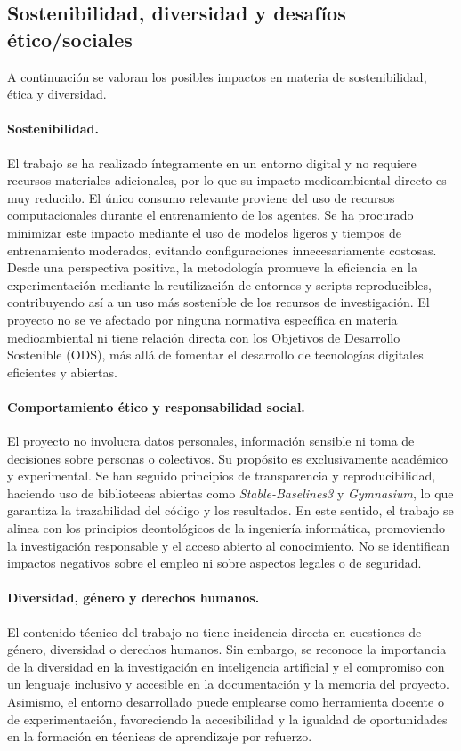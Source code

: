 \documentclass[12pt,a4paper,twoside,openany]{book}
\begin{document}
\subsection{Sostenibilidad, diversidad y desafíos ético/sociales}

A continuación se valoran los posibles impactos en materia de sostenibilidad, ética y diversidad.

\paragraph{Sostenibilidad.}
El trabajo se ha realizado íntegramente en un entorno digital y no requiere recursos materiales adicionales, por lo que su impacto medioambiental directo es muy reducido. El único consumo relevante proviene del uso de recursos computacionales durante el entrenamiento de los agentes. Se ha procurado minimizar este impacto mediante el uso de modelos ligeros y tiempos de entrenamiento moderados, evitando configuraciones innecesariamente costosas. Desde una perspectiva positiva, la metodología promueve la eficiencia en la experimentación mediante la reutilización de entornos y scripts reproducibles, contribuyendo así a un uso más sostenible de los recursos de investigación. El proyecto no se ve afectado por ninguna normativa específica en materia medioambiental ni tiene relación directa con los Objetivos de Desarrollo Sostenible (ODS), más allá de fomentar el desarrollo de tecnologías digitales eficientes y abiertas.

\paragraph{Comportamiento ético y responsabilidad social.}
El proyecto no involucra datos personales, información sensible ni toma de decisiones sobre personas o colectivos. Su propósito es exclusivamente académico y experimental. Se han seguido principios de transparencia y reproducibilidad, haciendo uso de bibliotecas abiertas como \textit{Stable-Baselines3} y \textit{Gymnasium}, lo que garantiza la trazabilidad del código y los resultados. En este sentido, el trabajo se alinea con los principios deontológicos de la ingeniería informática, promoviendo la investigación responsable y el acceso abierto al conocimiento. No se identifican impactos negativos sobre el empleo ni sobre aspectos legales o de seguridad.

\paragraph{Diversidad, género y derechos humanos.}
El contenido técnico del trabajo no tiene incidencia directa en cuestiones de género, diversidad o derechos humanos. Sin embargo, se reconoce la importancia de la diversidad en la investigación en inteligencia artificial y el compromiso con un lenguaje inclusivo y accesible en la documentación y la memoria del proyecto. Asimismo, el entorno desarrollado puede emplearse como herramienta docente o de experimentación, favoreciendo la accesibilidad y la igualdad de oportunidades en la formación en técnicas de aprendizaje por refuerzo.
\end{document}
